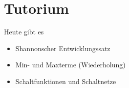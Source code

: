 \documentclass[aspectratio=169,usepdftitle=true,11pt,ngerman,t]{beamer}
\begin{document}
\section[vorbereitet \texttwemoji{nerd_face}]{Tutorium}

\begin{frame}{Heute gibt es}
    \begin{itemize}
        \item Shannonscher Entwicklungssatz
        \item Min- und Maxterme (Wiederholung)
        \item Schaltfunktionen und Schaltnetze
    \end{itemize}
\end{frame}
\end{document}
